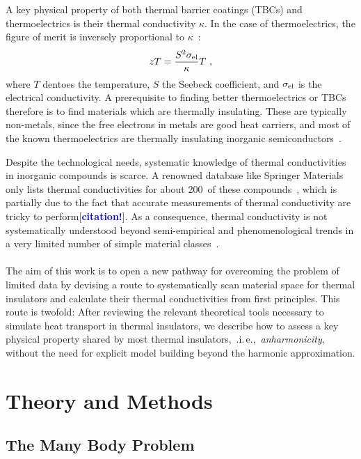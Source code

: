 \documentclass[a4paper,12pt]{book}
\newcommand{\REM}[1]{\textcolor{blue}{{\bf #1}}}
\begin{document}
A key physical property of both thermal barrier coatings (TBCs) and thermoelectrics is their thermal conductivity $\kappa$. In the case of thermoelectrics, the figure of merit is inversely proportional to $\kappa$~\cite{Nolas2001}:
\begin{align}
	zT = \frac{S^2 \sigma_{\rm el}}{\kappa} T~,
	\label{eq:zT}
\end{align} 
where $T$ dentoes the temperature, $S$ the Seebeck coefficient, and $\sigma_{\rm el}$ is the electrical conductivity.
A prerequisite to finding better thermoelectrics or TBCs therefore is to find materials which are thermally insulating. These are typically non-metals, since the free electrons in metals are good heat carriers, and most of the known thermoelectrics are thermally insulating inorganic semiconductors~\cite[p.\,15]{Nolas2001}.


Despite the technological needs, systematic knowledge of thermal conductivities in inorganic compounds is scarce. A renowned database like Springer Materials only lists thermal conductivities for about 200~of these compounds~\cite{SpringerMaterials}, which is partially due to the fact that accurate measurements of thermal conductivity are tricky to perform[\REM{citation!}]. As a consequence, thermal conductivity is not systematically understood beyond semi-empirical and phenomenological trends in a very limited number of simple material classes~\cite{Morelli}.
\\ \\
The aim of this work is to open a new pathway for overcoming the problem of limited data by devising a route to systematically scan material space for thermal insulators and calculate their thermal conductivities from first principles. This route is twofold: After reviewing the relevant theoretical tools necessary to simulate heat transport in thermal insulators, we describe how to assess a key physical property shared by most thermal insulators,~.i.\,e.,~\emph{anharmonicity}, without the need for explicit model building beyond the harmonic approximation.

\chapter{Theory and Methods}

\section{The Many Body Problem}

\end{document}
